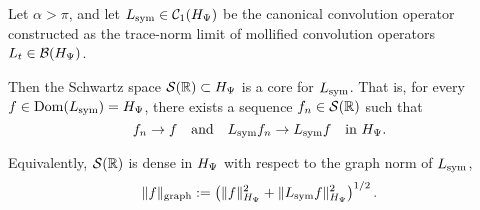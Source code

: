 \begin{proposition}
\label{prop:core_schwartz_density}
Let \( \alpha > \pi \), and let \( L_{\mathrm{sym}} \in \mathcal{C}_1(H_{\Psi}) \) be the canonical convolution operator constructed as the trace-norm limit of mollified convolution operators \( L_t \in \mathcal{B}(H_{\Psi}) \).

Then the Schwartz space \( \mathcal{S}(\mathbb{R}) \subset H_{\Psi} \) is a core for \( L_{\mathrm{sym}} \). That is, for every \( f \in \operatorname{Dom}(L_{\mathrm{sym}}) = H_{\Psi} \), there exists a sequence \( f_n \in \mathcal{S}(\mathbb{R}) \) such that
\[
f_n \to f \quad \text{and} \quad L_{\mathrm{sym}} f_n \to L_{\mathrm{sym}} f \quad \text{in } H_{\Psi}.
\]

\medskip
\noindent
Equivalently, \( \mathcal{S}(\mathbb{R}) \) is dense in \( H_{\Psi} \) with respect to the graph norm of \( L_{\mathrm{sym}} \),
\[
\|f\|_{\mathrm{graph}} := \left( \|f\|_{H_{\Psi}}^2 + \|L_{\mathrm{sym}} f\|_{H_{\Psi}}^2 \right)^{1/2}.
\]
\end{proposition}
